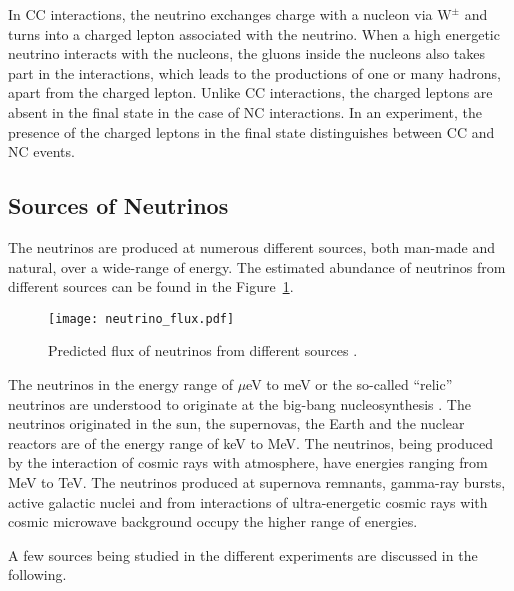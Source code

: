 In CC interactions, the neutrino exchanges charge with a nucleon via
$\mathrm{W}^{\pm}$ and turns into a charged lepton associated with the
neutrino. When a high energetic neutrino interacts with the nucleons,
the gluons inside the nucleons also takes part in the interactions,
which leads to the productions of one or many hadrons, apart from the
charged lepton. Unlike CC interactions, the charged leptons are absent
in the final state in the case of NC interactions. In an experiment,
the presence of the charged leptons in the final state distinguishes
between CC and NC events.

\subsection{Sources of Neutrinos}
The neutrinos are produced at numerous different sources, both
\mbox{man-made} and natural, over a wide-range of energy. The
estimated abundance of neutrinos from different sources can be found
in the Figure~\ref{fig:neutrino_flux}. 
\begin{figure}[h]
  \centering
  \texttt{[image: neutrino\_flux.pdf]}
  \caption{Predicted flux of neutrinos from different sources
    \cite{neutrinoflux}.}
  \label{fig:neutrino_flux}
\end{figure}

The neutrinos in the energy range of $\mu$eV to meV or the so-called
``relic'' neutrinos are understood to originate at the big-bang
nucleosynthesis \cite{nucleosynthesis}. The neutrinos originated in
the sun\cite{raydavis}, the supernovas, the
Earth\cite{kamland,borexino} and the nuclear reactors are of the
energy range of keV to MeV. The neutrinos, being produced by the
interaction of cosmic rays with atmosphere, have energies ranging
from MeV to TeV. The neutrinos produced at supernova remnants,
gamma-ray bursts, active galactic nuclei and from interactions of
ultra-energetic cosmic rays with cosmic microwave background occupy
the higher range of energies.

A few sources being studied in the different experiments are discussed
in the following.

